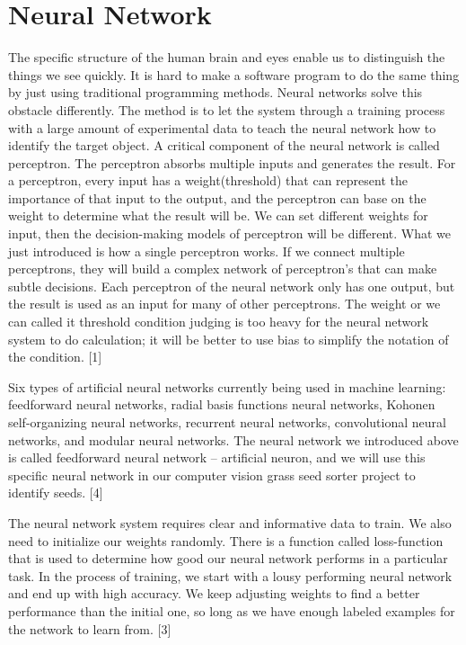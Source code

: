\documentclass[onecolumn, draftclsnofoot,10pt, compsoc]{IEEEtran}
\begin{document}
\section{Neural Network}
\par
The specific structure of the human brain and eyes enable us to distinguish the things we see quickly. It is hard to make a software program to do the same thing by just using traditional programming methods. Neural networks solve this obstacle differently. The method is to let the system through a training process with a large amount of experimental data to teach the neural network how to identify the target object. A critical component of the neural network is called perceptron. The perceptron absorbs multiple inputs and generates the result. For a perceptron, every input has a weight(threshold) that can represent the importance of that input to the output, and the perceptron can base on the weight to determine what the result will be. We can set different weights for input, then the decision-making models of perceptron will be different. What we just introduced is how a single perceptron works. If we connect multiple perceptrons, they will build a complex network of perceptron's that can make subtle decisions.  Each perceptron of the neural network only has one output, but the result is used as an input for many of other perceptrons. The weight or we can called it threshold condition judging is too heavy for the neural network system to do calculation; it will be better to use bias to simplify the notation of the condition. [1]
\par
Six types of artificial neural networks currently being used in machine learning: feedforward neural networks, radial basis functions neural networks, Kohonen self-organizing neural networks, recurrent neural networks, convolutional neural networks, and modular neural networks. The neural network we introduced above is called feedforward neural network – artificial neuron, and we will use this specific neural network in our computer vision grass seed sorter project to identify seeds.  [4]
\par
The neural network system requires clear and informative data to train.  We also need to initialize our weights randomly. There is a function called loss-function that is used to determine how good our neural network performs in a particular task. In the process of training, we start with a lousy performing neural network and end up with high accuracy. We keep adjusting weights to find a better performance than the initial one, so long as we have enough labeled examples for the network to learn from.  [3] 
\end{document}
